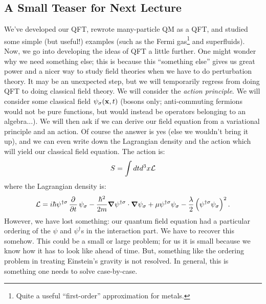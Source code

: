 \subsection{A Small Teaser for Next Lecture}
We've developed our QFT, rewrote many-particle QM as a QFT, and studied some simple (but useful!) examples (such as the Fermi gas\footnote{Quite a useful ``first-order'' approximation for metals.} and superfluids). Now, we go into developing the ideas of QFT a little further. One might wonder why we need something else; this is because this ``something else'' gives us great power and a nicer way to study field theories when we have to do perturbation theory. It may be an unexpected step, but we will temporarily regress from doing QFT to doing classical field theory. We will consider the \emph{action principle}. We will consider some classical field $\psi_\sigma(\mathbf{x}, t)$ (bosons only; anti-commuting fermions would not be pure functions, but would instead be operators belonging to an algebra...). We will then ask if we can derive our field equation from a variational principle and an action. Of course the answer is yes (else we wouldn't bring it up), and we can even write down the Lagrangian density and the action which will yield our classical field equation. The action is:
\begin{equation}
    S = \int dt d^3x \mathcal{L}
\end{equation}
where the Lagrangian density is:
\begin{equation}
    \L = i\hbar \psi^{\dag\sigma}\dpd{}{t}\psi_\sigma - \frac{\hbar^2}{2m}\nabla \psi^{\dag\sigma} \cdot \nabla \psi_\sigma + \mu \psi^{\dag\sigma}\psi_\sigma - \frac{\lambda}{2}\left(\psi^{\dag\sigma}\psi_\sigma\right)^2.
\end{equation}
However, we have lost something: our quantum field equation had a particular ordering of the $\psi$ and $\psi^\dag$s in the interaction part. We have to recover this somehow. This could be a small or large problem; for us it is small because we know how it has to look like ahead of time. But, something like the ordering problem in treating Einstein's gravity is not resolved. In general, this is something one needs to solve case-by-case.

